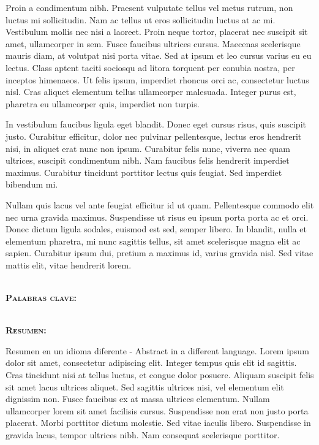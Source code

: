 Proin a condimentum nibh. Praesent vulputate tellus vel metus rutrum, non luctus mi sollicitudin. Nam ac tellus ut eros sollicitudin luctus at ac mi. Vestibulum mollis nec nisi a laoreet. Proin neque tortor, placerat nec suscipit sit amet, ullamcorper in sem. Fusce faucibus ultrices cursus. Maecenas scelerisque mauris diam, at volutpat nisi porta vitae. Sed at ipsum et leo cursus varius eu eu lectus. Class aptent taciti sociosqu ad litora torquent per conubia nostra, per inceptos himenaeos. Ut felis ipsum, imperdiet rhoncus orci ac, consectetur luctus nisl. Cras aliquet elementum tellus ullamcorper malesuada. Integer purus est, pharetra eu ullamcorper quis, imperdiet non turpis.

In vestibulum faucibus ligula eget blandit. Donec eget cursus risus, quis suscipit justo. Curabitur efficitur, dolor nec pulvinar pellentesque, lectus eros hendrerit nisi, in aliquet erat nunc non ipsum. Curabitur felis nunc, viverra nec quam ultrices, suscipit condimentum nibh. Nam faucibus felis hendrerit imperdiet maximus. Curabitur tincidunt porttitor lectus quis feugiat. Sed imperdiet bibendum mi.

Nullam quis lacus vel ante feugiat efficitur id ut quam. Pellentesque commodo elit nec urna gravida maximus. Suspendisse ut risus eu ipsum porta porta ac et orci. Donec dictum ligula sodales, euismod est sed, semper libero. In blandit, nulla et elementum pharetra, mi nunc sagittis tellus, sit amet scelerisque magna elit ac sapien. Curabitur ipsum dui, pretium a maximus id, varius gravida nisl. Sed vitae mattis elit, vitae hendrerit lorem. 





\newpage
\thispagestyle{empty}

\clearpage
\cleardoublepage
{}

\pagestyle{plain}

{\noindent \large \textbf{\thesisTitle}}\\

{\noindent \textbf{\textsc{Palabras clave:}}}

{\noindent \thesisKeywords}\\


{\noindent \textbf{\textsc{Resumen:}}}

\noindent Resumen en un idioma diferente - Abstract in a different language.
Lorem ipsum dolor sit amet, consectetur adipiscing elit. Integer tempus quis elit id sagittis. Cras tincidunt nisi at tellus luctus, et congue dolor posuere. Aliquam suscipit felis sit amet lacus ultrices aliquet. Sed sagittis ultrices nisi, vel elementum elit dignissim non. Fusce faucibus ex at massa ultrices elementum. Nullam ullamcorper lorem sit amet facilisis cursus. Suspendisse non erat non justo porta placerat. Morbi porttitor dictum molestie. Sed vitae iaculis libero. Suspendisse in gravida lacus, tempor ultrices nibh. Nam consequat scelerisque porttitor.


